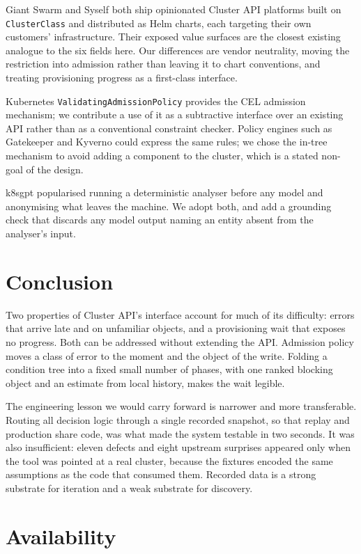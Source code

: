 \documentclass[conference]{IEEEtran}
\begin{document}
Giant Swarm and Syself both ship opinionated Cluster API platforms built on
\texttt{ClusterClass} and distributed as Helm charts, each targeting their own
customers' infrastructure. Their exposed value surfaces are the closest existing
analogue to the six fields here. Our differences are vendor neutrality, moving the
restriction into admission rather than leaving it to chart conventions, and
treating provisioning progress as a first-class interface.

Kubernetes \texttt{ValidatingAdmissionPolicy} \cite{vap} provides the CEL
admission mechanism; we contribute a use of it as a subtractive interface over an
existing API rather than as a conventional constraint checker. Policy engines such
as Gatekeeper and Kyverno could express the same rules; we chose the in-tree
mechanism to avoid adding a component to the cluster, which is a stated
non-goal of the design.

k8sgpt popularised running a deterministic analyser before any model and
anonymising what leaves the machine. We adopt both, and add a grounding check that
discards any model output naming an entity absent from the analyser's input.

\section{Conclusion}

Two properties of Cluster API's interface account for much of its difficulty:
errors that arrive late and on unfamiliar objects, and a provisioning wait that
exposes no progress. Both can be addressed without extending the API. Admission
policy moves a class of error to the moment and the object of the write. Folding a
condition tree into a fixed small number of phases, with one ranked blocking object
and an estimate from local history, makes the wait legible.

The engineering lesson we would carry forward is narrower and more transferable.
Routing all decision logic through a single recorded snapshot, so that replay and
production share code, was what made the system testable in two seconds. It was
also insufficient: eleven defects and eight upstream surprises appeared only when
the tool was pointed at a real cluster, because the fixtures encoded the same
assumptions as the code that consumed them. Recorded data is a strong substrate
for iteration and a weak substrate for discovery.

\section*{Availability}
\end{document}

